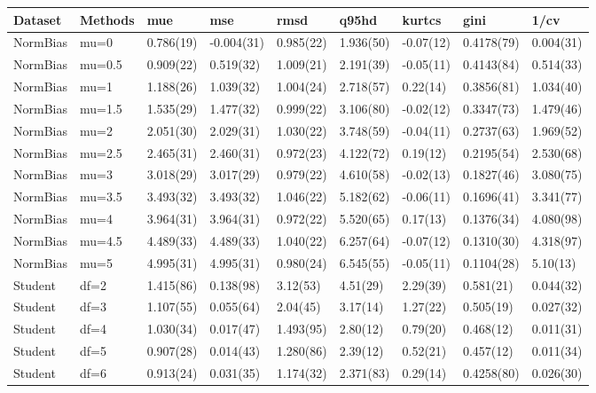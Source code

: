 \begin{table}[ht]
\centering
\begin{tabular}{lllllllll}
  \hline
Dataset & Methods & mue & mse & rmsd & q95hd & kurtcs & gini & 1/cv \\ 
  \hline
NormBias & mu=0 & 0.786(19) & -0.004(31) & 0.985(22) & 1.936(50) & -0.07(12) & 0.4178(79) & 0.004(31) \\ 
  NormBias & mu=0.5 & 0.909(22) & 0.519(32) & 1.009(21) & 2.191(39) & -0.05(11) & 0.4143(84) & 0.514(33) \\ 
  NormBias & mu=1 & 1.188(26) & 1.039(32) & 1.004(24) & 2.718(57) & 0.22(14) & 0.3856(81) & 1.034(40) \\ 
  NormBias & mu=1.5 & 1.535(29) & 1.477(32) & 0.999(22) & 3.106(80) & -0.02(12) & 0.3347(73) & 1.479(46) \\ 
  NormBias & mu=2 & 2.051(30) & 2.029(31) & 1.030(22) & 3.748(59) & -0.04(11) & 0.2737(63) & 1.969(52) \\ 
  NormBias & mu=2.5 & 2.465(31) & 2.460(31) & 0.972(23) & 4.122(72) & 0.19(12) & 0.2195(54) & 2.530(68) \\ 
  NormBias & mu=3 & 3.018(29) & 3.017(29) & 0.979(22) & 4.610(58) & -0.02(13) & 0.1827(46) & 3.080(75) \\ 
  NormBias & mu=3.5 & 3.493(32) & 3.493(32) & 1.046(22) & 5.182(62) & -0.06(11) & 0.1696(41) & 3.341(77) \\ 
  NormBias & mu=4 & 3.964(31) & 3.964(31) & 0.972(22) & 5.520(65) & 0.17(13) & 0.1376(34) & 4.080(98) \\ 
  NormBias & mu=4.5 & 4.489(33) & 4.489(33) & 1.040(22) & 6.257(64) & -0.07(12) & 0.1310(30) & 4.318(97) \\ 
  NormBias & mu=5 & 4.995(31) & 4.995(31) & 0.980(24) & 6.545(55) & -0.05(11) & 0.1104(28) & 5.10(13) \\ 
  Student & df=2 & 1.415(86) & 0.138(98) & 3.12(53) & 4.51(29) & 2.29(39) & 0.581(21) & 0.044(32) \\ 
  Student & df=3 & 1.107(55) & 0.055(64) & 2.04(45) & 3.17(14) & 1.27(22) & 0.505(19) & 0.027(32) \\ 
  Student & df=4 & 1.030(34) & 0.017(47) & 1.493(95) & 2.80(12) & 0.79(20) & 0.468(12) & 0.011(31) \\ 
  Student & df=5 & 0.907(28) & 0.014(43) & 1.280(86) & 2.39(12) & 0.52(21) & 0.457(12) & 0.011(34) \\ 
  Student & df=6 & 0.913(24) & 0.031(35) & 1.174(32) & 2.371(83) & 0.29(14) & 0.4258(80) & 0.026(30) \\ 

\end{tabular}
\end{table}
